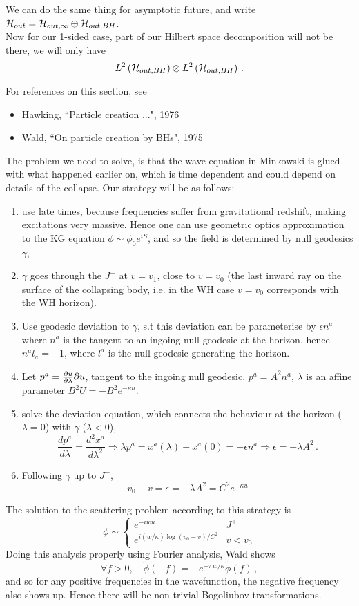 \documentclass{article}
\begin{document}
We can do the same thing for asymptotic future, and write $\mathcal{H}_{out} = \mathcal{H}_{out, \infty} \oplus \mathcal{H}_{out, BH}$. \\ 
Now for our 1-sided case, part of our Hilbert space decomposition will not be there, we will only have 
\[
L^2 \left( \mathcal{H}_{out, BH} \right) \otimes L^2 \left(  \mathcal{H}_{out, BH} \right) \, . 
\]
\begin{remark}
	For references on this section, see 
	\begin{itemize}
		\item Hawking, ``Particle creation ...", 1976
		\item Wald, ``On particle creation by BHs", 1975
	\end{itemize}
\end{remark}
The problem we need to solve, is that the wave equation in Minkowski is glued with what happened earlier on, which is time dependent and could depend on details of the collapse. Our strategy will be as follows:
\begin{enumerate}
	\item use late times, because frequencies suffer from gravitational redshift, making excitations very massive. Hence one can use geometric optics approximation to the KG equation $\phi \sim \phi_0 e^{iS}$, and so the field is determined by null geodesics $\gamma$, 
	\item $\gamma$ goes through the $J^-$ at $v=v_1$, close to $v=v_0$ (the last inward ray on the surface of the collapsing body, i.e. in the WH case $v=v_0$ corresponds with the WH horizon).
	\item Use geodesic deviation to $\gamma$, s.t this deviation can be parameterise by $\epsilon n^a$ where $n^a$ is the tangent to an ingoing null geodesic at the horizon, hence $n^a l_a = -1$, where $l^a$ is the null geodesic generating the horizon. 
	\item Let $p^a = \frac{\partial u }{\partial \lambda} \partial u$, tangent to the ingoing null geodesic. $p^a = A^2 n^a$, $\lambda$ is an affine parameter $B^2 U = -B^2 e^{-\kappa u}$.  
	\item solve the deviation equation, which connects the behaviour at the horizon ($\lambda=0$) with $\gamma$ ($\lambda < 0$), 
	\[
	\frac{dp^a}{d\lambda} = \frac{d^2 x^a}{d \lambda^2} \Rightarrow \lambda p^a = x^a(\lambda) - x^a(0) = - \epsilon n^a \Rightarrow \epsilon = -\lambda A^2 \, .
	\]
	\item Following $\gamma$ up to $J^-$, 
	\[
	v_0-v = \epsilon = -\lambda A^2 = C^2 e^{-\kappa u}
	\]
\end{enumerate}
The solution to the scattering problem according to this strategy is 
\[
\phi \sim \left \lbrace \begin{array}{cc}
e^{-iwu} & J^+ \\
e^{i (w/\kappa) \log(v_0-v)/C^2} & v < v_0
\end{array}\right .
\]
Doing this analysis properly using Fourier analysis, Wald shows 
\[
\forall f >0, \quad \tilde{\phi}(-f) = -e^{-\pi w/\kappa} \tilde{\phi}(f) \, ,
\]
and so for any positive frequencies in the wavefunction, the negative frequency also shows up. Hence there will be non-trivial Bogoliubov transformations. 
\end{document}
